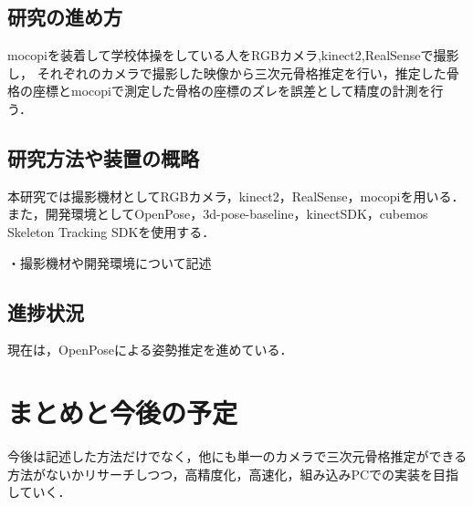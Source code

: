 \documentclass[titlepage]{jarticle}
\begin{document}
\subsection{研究の進め方}
%
mocopiを装着して学校体操をしている人をRGBカメラ,kinect2,RealSenseで撮影し，
それぞれのカメラで撮影した映像から三次元骨格推定を行い，推定した骨格の座標とmocopiで測定した骨格の座標のズレを誤差として精度の計測を行う．
%
%
%
\subsection{研究方法や装置の概略}
%
本研究では撮影機材としてRGBカメラ，kinect2，RealSense，mocopiを用いる．また，開発環境としてOpenPose，3d-pose-baseline，kinectSDK，cubemos Skeleton Tracking SDKを使用する．

・撮影機材や開発環境について記述



%

%
%
%
\subsection{進捗状況}
%
現在は，OpenPoseによる姿勢推定を進めている．
%
%
%

%

%
%
%
\section{まとめと今後の予定}
%
今後は記述した方法だけでなく，他にも単一のカメラで三次元骨格推定ができる方法がないかリサーチしつつ，高精度化，高速化，組み込みPCでの実装を目指していく．
%
%
\end{document}
